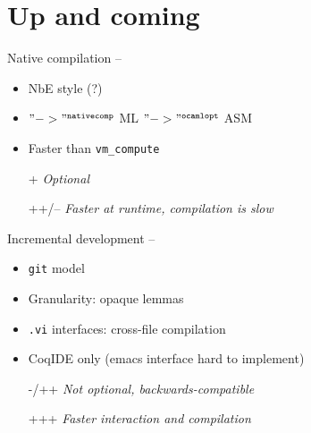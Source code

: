 \section{Up and coming}
\begin{subsecframe}{Native compilation -- }
\begin{itemize}
\item NbE style (?)
\item \Coq $"->"^{\texttt{nativecomp}}$ \textsc{ML} $"->"^{\texttt{ocamlopt}}$ \textsc{ASM}
\item Faster than \texttt{vm\_compute}
\end{itemize}

  \begin{itemize}
  \item[+] \emph{Optional}
  \item[++/--] \emph{Faster at runtime, compilation is slow}
  \end{itemize}
\end{subsecframe}

\begin{subsecframe}{Incremental development -- }
  \begin{itemize}
  \item \texttt{git} model
  \item Granularity: opaque lemmas
  \item \texttt{.vi} interfaces: cross-file compilation
  \item CoqIDE only (emacs interface hard to implement)
  \end{itemize}

  \begin{itemize}
  \item[-/++] \emph{Not optional, backwards-compatible}
  \item[+++] \emph{Faster interaction and compilation}
  \end{itemize}
\end{subsecframe}

